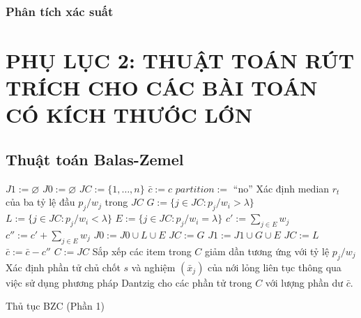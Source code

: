\subsection{Phân tích xác suất}


\chapter*{PHỤ LỤC 2: THUẬT TOÁN RÚT TRÍCH CHO CÁC BÀI TOÁN CÓ KÍCH THƯỚC LỚN}

\section{Thuật toán Balas-Zemel}

\begin{algorithm}[h]
    \DontPrintSemicolon
    \vspace{1em}
    \vspace{1em}
    $J1 := \varnothing$\;
    $J0 := \varnothing$\;
    $JC := \{1, \dots, n\}$\;
    $\bar{c} := c$\;
    $partition := $ ``no''\;
    {
        Xác định median $r_t$ của ba tỷ lệ đầu $p_j / w_j$ trong $JC$\;
        $G := \{j \in JC: p_j/w_i > \lambda\}$\;
        $L := \{j \in JC: p_j/w_i < \lambda\}$\;
        $E := \{j \in JC: p_j/w_i = \lambda\}$\;
        $c':=\sum_{j\in E}w_j$\;
        $c'':= c' + \sum_{j\in E}w_j$\;
        {
            $J0:=J0\cup L \cup E$\;
            $JC := G$\;
        }
        \Else
        {
            $J1:=J1\cup G \cup E$\;
            $JC := L$\;
            $\bar{c} := \bar{c} - c''$\;
        }
    }
    {
        $C:=JC$\;
        Sắp xếp các item trong $C$ giảm dần tương ứng với tỷ lệ $p_j/w_j$\;
        Xác định phần tử chủ chốt $s$ và nghiệm $(\bar{x}_j)$ của nới lỏng liên tục thông qua việc sử dụng phương pháp Dantzig cho các phần tử trong $C$ với lượng phần dư $\bar{c}$.
    }
    \caption{Thủ tục BZC (Phần 1)}
    \label{algo:bzc_part1}
\end{algorithm}

